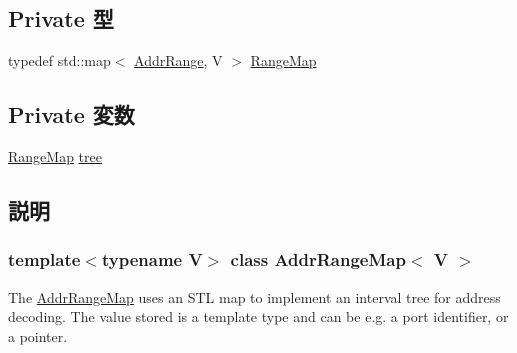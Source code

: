 \subsection*{Private 型}
\begin{DoxyCompactItemize}
\item 
typedef std::map$<$ \hyperlink{classAddrRange}{AddrRange}, V $>$ \hyperlink{classAddrRangeMap_a28cfa29c62233971dbce319cd94e24ca}{RangeMap}
\end{DoxyCompactItemize}
\subsection*{Private 変数}
\begin{DoxyCompactItemize}
\item 
\hyperlink{classAddrRangeMap_a28cfa29c62233971dbce319cd94e24ca}{RangeMap} \hyperlink{classAddrRangeMap_a3a72c569864f92e88af53d780f71ceac}{tree}
\end{DoxyCompactItemize}


\subsection{説明}
\subsubsection*{template$<$typename V$>$ class AddrRangeMap$<$ V $>$}

The \hyperlink{classAddrRangeMap}{AddrRangeMap} uses an STL map to implement an interval tree for address decoding. The value stored is a template type and can be e.g. a port identifier, or a pointer. 

